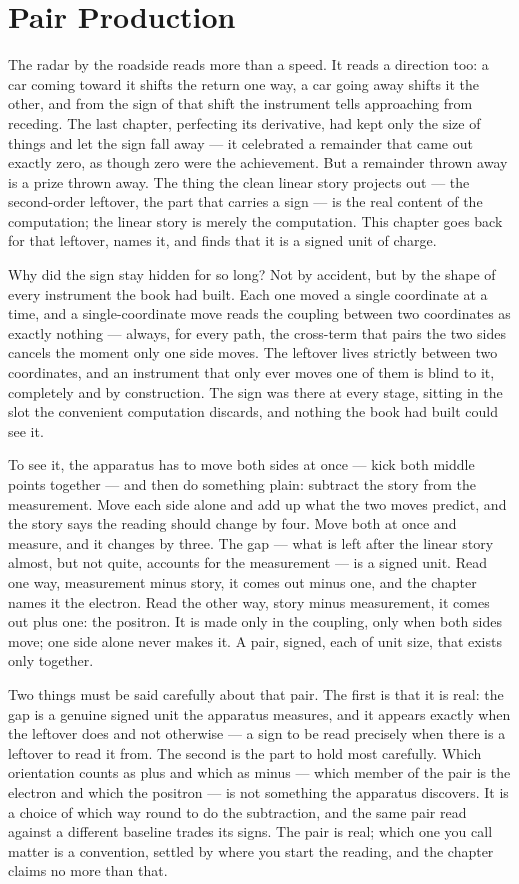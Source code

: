 \chapter{Pair Production}

The radar by the roadside reads more than a speed. It reads a direction too: a car coming toward it shifts the return one way, a car going away shifts it the other, and from the sign of that shift the instrument tells approaching from receding. The last chapter, perfecting its derivative, had kept only the size of things and let the sign fall away --- it celebrated a remainder that came out exactly zero, as though zero were the achievement. But a remainder thrown away is a prize thrown away. The thing the clean linear story projects out --- the second-order leftover, the part that carries a sign --- is the real content of the computation; the linear story is merely the computation. This chapter goes back for that leftover, names it, and finds that it is a signed unit of charge.

Why did the sign stay hidden for so long? Not by accident, but by the shape of every instrument the book had built. Each one moved a single coordinate at a time, and a single-coordinate move reads the coupling between two coordinates as exactly nothing --- always, for every path, the cross-term that pairs the two sides cancels the moment only one side moves. The leftover lives strictly between two coordinates, and an instrument that only ever moves one of them is blind to it, completely and by construction. The sign was there at every stage, sitting in the slot the convenient computation discards, and nothing the book had built could see it.

To see it, the apparatus has to move both sides at once --- kick both middle points together --- and then do something plain: subtract the story from the measurement. Move each side alone and add up what the two moves predict, and the story says the reading should change by four. Move both at once and measure, and it changes by three. The gap --- what is left after the linear story almost, but not quite, accounts for the measurement --- is a signed unit. Read one way, measurement minus story, it comes out minus one, and the chapter names it the electron. Read the other way, story minus measurement, it comes out plus one: the positron. It is made only in the coupling, only when both sides move; one side alone never makes it. A pair, signed, each of unit size, that exists only together.

Two things must be said carefully about that pair. The first is that it is real: the gap is a genuine signed unit the apparatus measures, and it appears exactly when the leftover does and not otherwise --- a sign to be read precisely when there is a leftover to read it from. The second is the part to hold most carefully. Which orientation counts as plus and which as minus --- which member of the pair is the electron and which the positron --- is not something the apparatus discovers. It is a choice of which way round to do the subtraction, and the same pair read against a different baseline trades its signs. The pair is real; which one you call matter is a convention, settled by where you start the reading, and the chapter claims no more than that.

